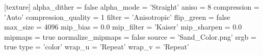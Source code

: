 [texture]
alpha_dither = false
alpha_mode = 'Straight'
aniso = 8
compression = 'Auto'
compression_quality = 1
filter = 'Anisotropic'
flip_green = false
max_size = 4096
mip_bias = 0.0
mip_filter = 'Kaiser'
mip_sharpen = 0.0
mipmaps = true
normalize_mipmaps = false
source = 'Sand_Color.png'
srgb = true
type = 'color'
wrap_u = 'Repeat'
wrap_v = 'Repeat'